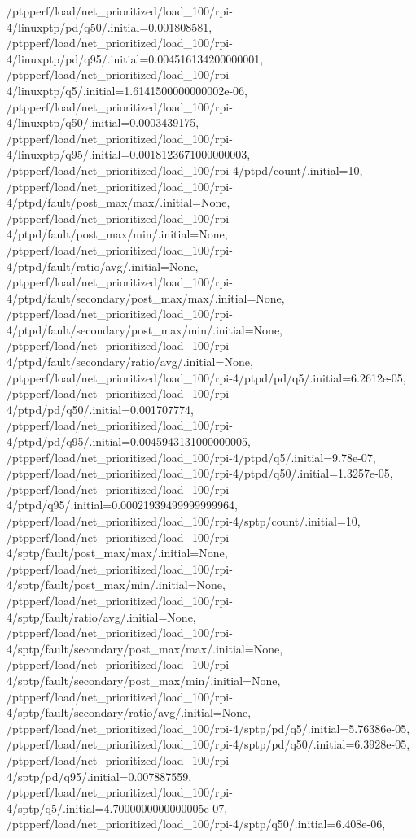 {    /ptpperf/load/net_prioritized/load_100/rpi-4/linuxptp/pd/q50/.initial=0.001808581,
    /ptpperf/load/net_prioritized/load_100/rpi-4/linuxptp/pd/q95/.initial=0.004516134200000001,
    /ptpperf/load/net_prioritized/load_100/rpi-4/linuxptp/q5/.initial=1.6141500000000002e-06,
    /ptpperf/load/net_prioritized/load_100/rpi-4/linuxptp/q50/.initial=0.0003439175,
    /ptpperf/load/net_prioritized/load_100/rpi-4/linuxptp/q95/.initial=0.0018123671000000003,
    /ptpperf/load/net_prioritized/load_100/rpi-4/ptpd/count/.initial=10,
    /ptpperf/load/net_prioritized/load_100/rpi-4/ptpd/fault/post_max/max/.initial=None,
    /ptpperf/load/net_prioritized/load_100/rpi-4/ptpd/fault/post_max/min/.initial=None,
    /ptpperf/load/net_prioritized/load_100/rpi-4/ptpd/fault/ratio/avg/.initial=None,
    /ptpperf/load/net_prioritized/load_100/rpi-4/ptpd/fault/secondary/post_max/max/.initial=None,
    /ptpperf/load/net_prioritized/load_100/rpi-4/ptpd/fault/secondary/post_max/min/.initial=None,
    /ptpperf/load/net_prioritized/load_100/rpi-4/ptpd/fault/secondary/ratio/avg/.initial=None,
    /ptpperf/load/net_prioritized/load_100/rpi-4/ptpd/pd/q5/.initial=6.2612e-05,
    /ptpperf/load/net_prioritized/load_100/rpi-4/ptpd/pd/q50/.initial=0.001707774,
    /ptpperf/load/net_prioritized/load_100/rpi-4/ptpd/pd/q95/.initial=0.0045943131000000005,
    /ptpperf/load/net_prioritized/load_100/rpi-4/ptpd/q5/.initial=9.78e-07,
    /ptpperf/load/net_prioritized/load_100/rpi-4/ptpd/q50/.initial=1.3257e-05,
    /ptpperf/load/net_prioritized/load_100/rpi-4/ptpd/q95/.initial=0.00021939499999999964,
    /ptpperf/load/net_prioritized/load_100/rpi-4/sptp/count/.initial=10,
    /ptpperf/load/net_prioritized/load_100/rpi-4/sptp/fault/post_max/max/.initial=None,
    /ptpperf/load/net_prioritized/load_100/rpi-4/sptp/fault/post_max/min/.initial=None,
    /ptpperf/load/net_prioritized/load_100/rpi-4/sptp/fault/ratio/avg/.initial=None,
    /ptpperf/load/net_prioritized/load_100/rpi-4/sptp/fault/secondary/post_max/max/.initial=None,
    /ptpperf/load/net_prioritized/load_100/rpi-4/sptp/fault/secondary/post_max/min/.initial=None,
    /ptpperf/load/net_prioritized/load_100/rpi-4/sptp/fault/secondary/ratio/avg/.initial=None,
    /ptpperf/load/net_prioritized/load_100/rpi-4/sptp/pd/q5/.initial=5.76386e-05,
    /ptpperf/load/net_prioritized/load_100/rpi-4/sptp/pd/q50/.initial=6.3928e-05,
    /ptpperf/load/net_prioritized/load_100/rpi-4/sptp/pd/q95/.initial=0.007887559,
    /ptpperf/load/net_prioritized/load_100/rpi-4/sptp/q5/.initial=4.7000000000000005e-07,
    /ptpperf/load/net_prioritized/load_100/rpi-4/sptp/q50/.initial=6.408e-06,
}
